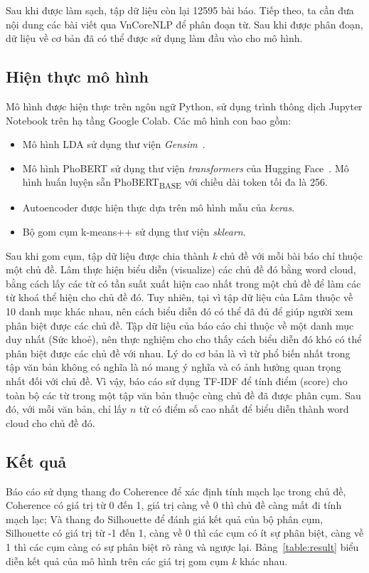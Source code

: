 Sau khi được làm sạch, tập dữ liệu còn lại 12595 bài báo. Tiếp theo, ta cần đưa
nội dung các bài viết qua VnCoreNLP để phân đoạn từ. Sau khi được phân đoạn, dữ
liệu về cơ bản đã có thể được sử dụng làm đầu vào cho mô hình.

\subsection{Hiện thực mô hình}
Mô hình được hiện thực trên ngôn ngữ Python, sử dụng trình thông dịch Jupyter
Notebook trên hạ tầng Google Colab. Các mô hình con bao gồm:

\begin{itemize}
    \item Mô hình LDA sử dụng thư viện
        \textit{Gensim}~\cite{GensimTopicModelling2021}.
    \item Mô hình PhoBERT sử dụng thư viện \textit{transformers} của Hugging
        Face~\cite{wolfTransformersStateoftheArtNatural2020}. Mô hình huấn
        luyện sẵn PhoBERT\textsubscript{BASE} với chiều dài token tối đa là
        256.
    \item Autoencoder được hiện thực dựa trên mô hình mẫu của \textit{keras}.
    \item Bộ gom cụm k-means++ sử dụng thư viện \textit{sklearn}.
\end{itemize}

Sau khi gom cụm, tập dữ liệu được chia thành \textit{k} chủ đề với mỗi bài báo
chỉ thuộc một chủ đề. Lâm \cite{lamGomCumVan2021} thực hiện biểu diễn
(visualize) các chủ đề đó bằng word cloud, bằng cách lấy các từ có tần suất
xuất hiện cao nhất trong một chủ đề để làm các từ khoá thể hiện cho chủ đề đó.
Tuy nhiên, tại vì tập dữ liệu của Lâm \cite{lamGomCumVan2021} thuộc về 10 danh
mục khác nhau, nên cách biểu diễn đó có thể đã đủ để giúp người xem phân biệt
được các chủ đề. Tập dữ liệu của báo cáo chỉ thuộc về một danh mục duy nhất
(Sức khoẻ), nên thực nghiệm cho cho thấy cách biểu diễn đó khó có thể phân biệt
được các chủ đề với nhau. Lý do cơ bản là vì từ phổ biến nhất trong tập văn bản
không có nghĩa là nó mang ý nghĩa và có ảnh hưởng quan trọng nhất đối với chủ
đề. Vì vậy, báo cáo sử dụng TF-IDF để tính điểm (score) cho toàn bộ các từ
trong một tập văn bản thuộc cùng chủ đề đã được phân cụm. Sau đó, với mỗi văn
bản, chỉ lấy $n$ từ có điểm số cao nhất để biểu diễn thành word cloud cho chủ
đề đó.

\subsection{Kết quả}
Báo cáo sử dụng thang đo Coherence để xác định tính mạch lạc trong chủ đề,
Coherence có giá trị từ 0 đến 1, giá trị càng về 0 thì chủ đề càng mất đi tính
mạch lạc; Và thang đo Silhouette để đánh giá kết quả của bộ phân cụm,
Silhouette có giá trị từ -1 đến 1, càng về 0 thì các cụm có ít sự phân biệt,
càng về 1 thì các cụm càng có sự phân biệt rõ ràng và ngược lại.
Bảng~\ref{table:result} biểu diễn kết quả của mô hình trên các giá trị gom cụm
\textit{k} khác nhau.

